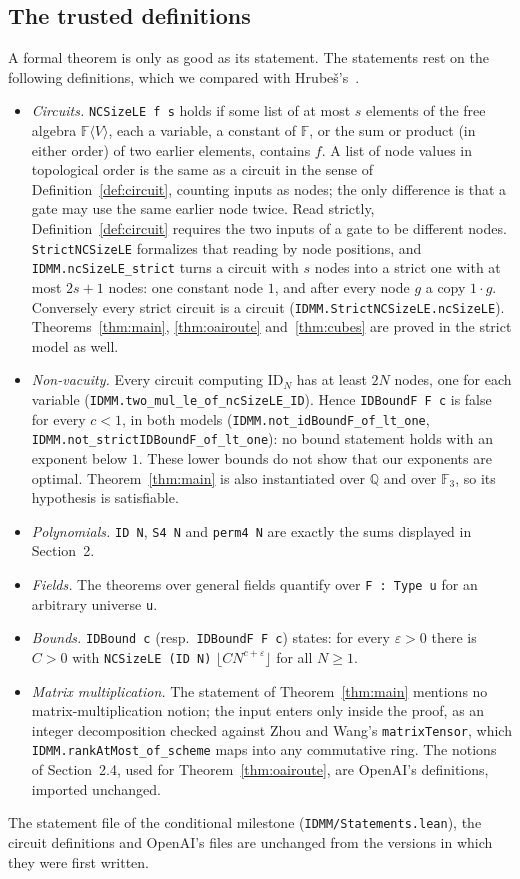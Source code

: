 \documentclass[11pt]{article}
\theoremstyle{definition}
\theoremstyle{remark}
\newcommand{\F}{\mathbb{F}}
\newcommand{\ID}{\mathrm{ID}}
\newcommand{\lean}[1]{\texttt{#1}}
\begin{document}
\subsection{The trusted definitions}\label{sec:trusted}
A formal theorem is only as good as its statement. The statements rest on the following definitions, which we
compared with Hrube\v{s}'s~\cite{Hrubes2026}.
\begin{itemize}
\item \emph{Circuits.} \lean{NCSizeLE f s} holds if some list of at most $s$ elements of the free algebra
$\F\langle V\rangle$, each a variable, a constant of $\F$, or the sum or product (in either order) of two earlier
elements, contains $f$. A list of node values in topological order is the same as a circuit in the sense of
Definition~\ref{def:circuit}, counting inputs as nodes; the only difference is that a gate may use the same earlier
node twice. Read strictly, Definition~\ref{def:circuit} requires the two inputs of a gate to be different nodes.
\lean{StrictNCSizeLE} formalizes that reading by node positions, and \lean{IDMM.ncSizeLE\_strict} turns a circuit
with $s$ nodes into a strict one with at most $2s+1$ nodes: one constant node $1$, and after every node $g$ a copy
$1\cdot g$. Conversely every strict circuit is a circuit (\lean{IDMM.StrictNCSizeLE.ncSizeLE}).
Theorems~\ref{thm:main}, \ref{thm:oairoute} and~\ref{thm:cubes} are proved in the strict model as well.
\item \emph{Non-vacuity.} Every circuit computing $\ID_N$ has at least $2N$ nodes, one for each variable
(\lean{IDMM.two\_mul\_le\_of\_ncSizeLE\_ID}). Hence \lean{IDBoundF F c} is false for every $c<1$, in both models
(\lean{IDMM.not\_idBoundF\_of\_lt\_one}, \lean{IDMM.not\_strictIDBoundF\_of\_lt\_one}): no bound statement holds
with an exponent below $1$. These lower bounds do not show that our exponents are optimal. Theorem~\ref{thm:main} is also instantiated over $\mathbb{Q}$ and over $\mathbb{F}_3$, so
its hypothesis is satisfiable.
\item \emph{Polynomials.} \lean{ID N}, \lean{S4 N} and \lean{perm4 N} are exactly the sums displayed in Section~2.
\item \emph{Fields.} The theorems over general fields quantify over \lean{F : Type u} for an arbitrary universe
\lean{u}.
\item \emph{Bounds.} \lean{IDBound c} (resp.\ \lean{IDBoundF F c}) states: for every $\varepsilon>0$ there is
$C>0$ with \lean{NCSizeLE (ID N)} $\lfloor CN^{c+\varepsilon}\rfloor$ for all $N\ge1$.
\item \emph{Matrix multiplication.} The statement of Theorem~\ref{thm:main} mentions no matrix-multiplication
notion; the input enters only inside the proof, as an integer decomposition checked against Zhou and Wang's
\lean{matrixTensor}, which \lean{IDMM.rankAtMost\_of\_scheme} maps into any commutative ring. The notions of
Section~2.4, used for Theorem~\ref{thm:oairoute}, are OpenAI's definitions, imported unchanged.
\end{itemize}
The statement file of the conditional milestone (\lean{IDMM/Statements.lean}), the circuit definitions and
OpenAI's files are unchanged from the versions in which they were first written.
\end{document}
